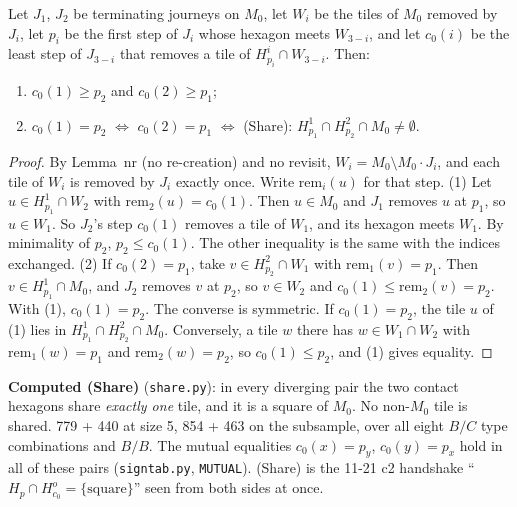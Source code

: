 \documentclass[11pt]{article}
\theoremstyle{definition}\newtheorem{definition}[theorem]{Definition}\newtheorem{remark}[theorem]{Remark}
\begin{document}
\begin{lemma}\label{lem:hs}
Let $J_1$, $J_2$ be terminating journeys on $M_0$, let $W_i$ be the tiles of $M_0$ removed by $J_i$, let $p_i$ be the first step of $J_i$ whose hexagon meets $W_{3-i}$, and let $c_0(i)$ be the least step of $J_{3-i}$ that removes a tile of $H^i_{p_i}\cap W_{3-i}$. Then:
\begin{enumerate}
\item $c_0(1)\ge p_2$ and $c_0(2)\ge p_1$;
\item $c_0(1)=p_2$ $\iff$ $c_0(2)=p_1$ $\iff$ \textup{(Share)}: $H^1_{p_1}\cap H^2_{p_2}\cap M_0\ne\emptyset$.
\end{enumerate}
\end{lemma}
\begin{proof}
By Lemma~nr (no re-creation) and no revisit, $W_i=M_0\setminus M_0\cdot J_i$, and each tile of $W_i$ is removed by $J_i$ exactly once. Write $\mathrm{rem}_i(u)$ for that step.
(1) Let $u\in H^1_{p_1}\cap W_2$ with $\mathrm{rem}_2(u)=c_0(1)$. Then $u\in M_0$ and $J_1$ removes $u$ at $p_1$, so $u\in W_1$. So $J_2$'s step $c_0(1)$ removes a tile of $W_1$, and its hexagon meets $W_1$. By minimality of $p_2$, $p_2\le c_0(1)$. The other inequality is the same with the indices exchanged.
(2) If $c_0(2)=p_1$, take $v\in H^2_{p_2}\cap W_1$ with $\mathrm{rem}_1(v)=p_1$. Then $v\in H^1_{p_1}\cap M_0$, and $J_2$ removes $v$ at $p_2$, so $v\in W_2$ and $c_0(1)\le\mathrm{rem}_2(v)=p_2$. With (1), $c_0(1)=p_2$. The converse is symmetric. If $c_0(1)=p_2$, the tile $u$ of (1) lies in $H^1_{p_1}\cap H^2_{p_2}\cap M_0$. Conversely, a tile $w$ there has $w\in W_1\cap W_2$ with $\mathrm{rem}_1(w)=p_1$ and $\mathrm{rem}_2(w)=p_2$, so $c_0(1)\le p_2$, and (1) gives equality.
\end{proof}
\noindent\textbf{Computed (Share)} (\texttt{share.py}): in every diverging pair the two contact hexagons share \emph{exactly one} tile, and it is a square of $M_0$. No non-$M_0$ tile is shared. 779 + 440 at size 5, 854 + 463 on the subsample, over all eight $B/C$ type combinations and $B/B$. The mutual equalities $c_0(x)=p_y$, $c_0(y)=p_x$ hold in all of these pairs (\texttt{signtab.py}, \texttt{MUTUAL}). (Share) is the 11-21 c2 handshake ``$H_p\cap H^o_{c_0}=\{\text{square}\}$'' seen from both sides at once.
\end{document}
